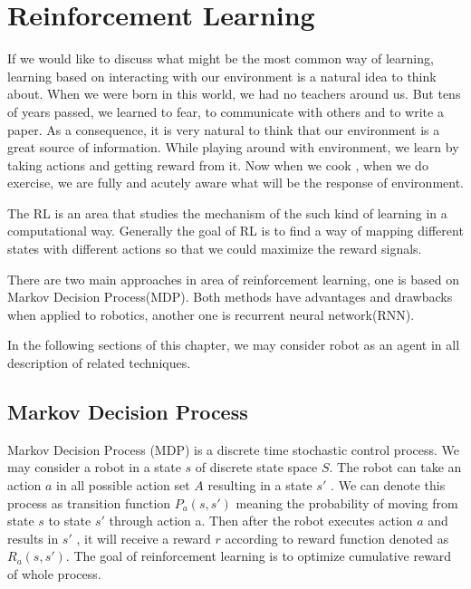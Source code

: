 \documentclass[officiallayout]{tktla}
\begin{document}
\chapter{Reinforcement Learning}

If we would like to discuss what might be the most common way of learning, learning based on interacting with our environment is a natural idea to think about. When we were born in this world, we had no teachers around us. But tens of years passed, we learned to fear, to communicate with others and to write a paper. As a consequence, it is very natural to think that our environment is a great source of information. While playing around with environment, we learn by taking actions and getting reward from it. Now when we cook , when we do exercise, we are fully and acutely aware what will be the response of environment.

The RL is an area that studies the mechanism of the such kind of learning in a computational way. Generally the goal of RL is to find a way of mapping different states with different actions so that we could maximize the reward signals. 

There are two main approaches in area of reinforcement learning, one is based on Markov Decision Process(MDP)\cite{Sutton1998a}. Both methods have advantages and drawbacks when applied to robotics, another one is recurrent neural network(RNN)\cite{williams1989learning}.

In the following sections of this chapter, we may consider robot as an agent in all description of related techniques.

\section{Markov Decision Process}
Markov Decision Process (MDP) is a discrete time stochastic control process. We may consider a robot in a state $s$ of discrete state space $S$. The robot can take an action $a$ in all possible action set $A$ resulting in a state $s'$ . We can denote this process as transition function
$P_a(s, s')$ meaning the probability of moving from state
$s$ to state $s'$ through action a. Then after the robot executes action $a$ and results in $s'$ , it will receive a reward $r$ according to reward function denoted as $R_a(s, s ')$. The goal of reinforcement learning is to optimize cumulative reward of whole process. 
\end{document}
